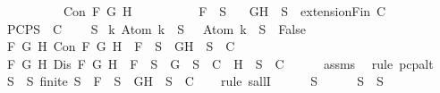 \begin{isabellebody}
\ \ \ \ \ \ \ \ \ \ {\isachardoublequoteopen}Con\ F\ G\ H{\isachardoublequoteclose}\isanewline
\ \ \ \ \ \ \ \ \ \ {\isachardoublequoteopen}F\ {\isasymin}\ S{\isachardoublequoteclose}\isanewline
\ \ \ {\isachardoublequoteopen}{\isacharbraceleft}G{\isacharcomma}H{\isacharbraceright}\ {\isasymunion}\ S\ {\isasymin}\ {\isacharparenleft}extensionFin\ C{\isacharparenright}{\isachardoublequoteclose}\ \isanewline
%
\isadelimproof
%
\endisadelimproof
%
\isatagproof
{}\isamarkupfalse%
\ {\isacharminus}\isanewline
\ \ \isamarkupfalse%
\ PCP{\isacharcolon}{\isachardoublequoteopen}{\isasymforall}S\ {\isasymin}\ C{\isachardot}\isanewline
\ \ {\isasymbottom}\ {\isasymnotin}\ S\isanewline
{\isasymand}\ {\isacharparenleft}{\isasymforall}k{\isachardot}\ Atom\ k\ {\isasymin}\ S\ {\isasymlongrightarrow}\ \isactrlbold {\isasymnot}\ {\isacharparenleft}Atom\ k{\isacharparenright}\ {\isasymin}\ S\ {\isasymlongrightarrow}\ False{\isacharparenright}\isanewline
{\isasymand}\ {\isacharparenleft}{\isasymforall}F\ G\ H{\isachardot}\ Con\ F\ G\ H\ {\isasymlongrightarrow}\ F\ {\isasymin}\ S\ {\isasymlongrightarrow}\ {\isacharbraceleft}G{\isacharcomma}H{\isacharbraceright}\ {\isasymunion}\ S\ {\isasymin}\ C{\isacharparenright}\isanewline
{\isasymand}\ {\isacharparenleft}{\isasymforall}F\ G\ H{\isachardot}\ Dis\ F\ G\ H\ {\isasymlongrightarrow}\ F\ {\isasymin}\ S\ {\isasymlongrightarrow}\ {\isacharbraceleft}G{\isacharbraceright}\ {\isasymunion}\ S\ {\isasymin}\ C\ {\isasymor}\ {\isacharbraceleft}H{\isacharbraceright}\ {\isasymunion}\ S\ {\isasymin}\ C{\isacharparenright}{\isachardoublequoteclose}\isanewline
\ \ \ \ \isamarkupfalse%
\ assms{\isacharparenleft}{}{\isacharparenright}\ \isamarkupfalse%
\ {\isacharparenleft}rule\ pcp{\isacharunderscore}alt{}{\isacharparenright}\isanewline
\ \ \isamarkupfalse%
\ {}{\isacharcolon}{\isachardoublequoteopen}{\isasymforall}S{\isacharprime}\ {\isasymsubseteq}\ S{\isachardot}\ finite\ S{\isacharprime}\ {\isasymlongrightarrow}\ F\ {\isasymin}\ S{\isacharprime}\ {\isasymlongrightarrow}\ {\isacharbraceleft}G{\isacharcomma}H{\isacharbraceright}\ {\isasymunion}\ S{\isacharprime}\ {\isasymin}\ C{\isachardoublequoteclose}\isanewline
\ \ \isamarkupfalse%
\ {\isacharparenleft}rule\ sallI{\isacharparenright}\isanewline
\ \ \ \ \isamarkupfalse%
\ S{\isacharprime}\isanewline
\ \ \ \ \isamarkupfalse%
\ {\isachardoublequoteopen}S{\isacharprime}\ {\isasymsubseteq}\ S{\isachardoublequoteclose}\isanewline

\end{isabellebody}
